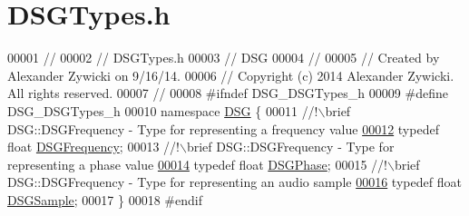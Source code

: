 \hypertarget{_d_s_g_types_8h_source}{\section{D\+S\+G\+Types.\+h}
\label{_d_s_g_types_8h_source}
}

\begin{DoxyCode}
00001 \textcolor{comment}{//}
00002 \textcolor{comment}{//  DSGTypes.h}
00003 \textcolor{comment}{//  DSG}
00004 \textcolor{comment}{//}
00005 \textcolor{comment}{//  Created by Alexander Zywicki on 9/16/14.}
00006 \textcolor{comment}{//  Copyright (c) 2014 Alexander Zywicki. All rights reserved.}
00007 \textcolor{comment}{//}
00008 \textcolor{preprocessor}{#ifndef DSG\_DSGTypes\_h}
00009 \textcolor{preprocessor}{#define DSG\_DSGTypes\_h}
00010 \textcolor{keyword}{namespace }\hyperlink{namespace_d_s_g}{DSG} \{\textcolor{comment}{}
00011 \textcolor{comment}{    //!\(\backslash\)brief DSG::DSGFrequency - Type for representing a frequency value}
\hypertarget{_d_s_g_types_8h_source_l00012}{}\hyperlink{namespace_d_s_g_a4315a061386fa1014fda09b15d3a6973}{00012} \textcolor{comment}{}    \textcolor{keyword}{typedef} \textcolor{keywordtype}{float} \hyperlink{namespace_d_s_g_a4315a061386fa1014fda09b15d3a6973}{DSGFrequency};\textcolor{comment}{}
00013 \textcolor{comment}{    //!\(\backslash\)brief DSG::DSGFrequency - Type for representing a phase value}
\hypertarget{_d_s_g_types_8h_source_l00014}{}\hyperlink{namespace_d_s_g_a44431ce1eb0a7300efdd207bc879e52c}{00014} \textcolor{comment}{}    \textcolor{keyword}{typedef} \textcolor{keywordtype}{float} \hyperlink{namespace_d_s_g_a44431ce1eb0a7300efdd207bc879e52c}{DSGPhase};\textcolor{comment}{}
00015 \textcolor{comment}{    //!\(\backslash\)brief DSG::DSGFrequency - Type for representing an audio sample}
\hypertarget{_d_s_g_types_8h_source_l00016}{}\hyperlink{namespace_d_s_g_ac39a94cd27ebcd9c1e7502d0c624894a}{00016} \textcolor{comment}{}    \textcolor{keyword}{typedef} \textcolor{keywordtype}{float} \hyperlink{namespace_d_s_g_ac39a94cd27ebcd9c1e7502d0c624894a}{DSGSample};
00017 \}
00018 \textcolor{preprocessor}{#endif}
\end{DoxyCode}
